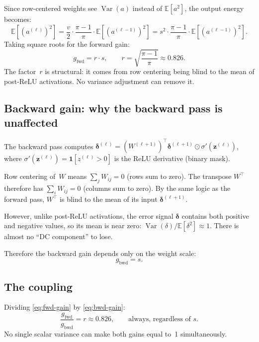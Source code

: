 \documentclass[11pt,a4paper]{article}
\theoremstyle{definition}
\newcommand{\E}{\mathbb{E}}
\newcommand{\Var}{\operatorname{Var}}
\begin{document}
Since row-centered weights see $\Var(a)$ instead of $\E[a^2]$, the output energy becomes:
\[
  \E[(a^{(\ell)})^2] = \frac{v}{2} \cdot \frac{\pi-1}{\pi} \cdot \E[(a^{(\ell-1)})^2]
                      = s^2 \cdot \frac{\pi-1}{\pi} \cdot \E[(a^{(\ell-1)})^2].
\]
Taking square roots for the forward gain:
\begin{equation}\label{eq:fwd-gain}
  \boxed{\;g_{\mathrm{fwd}} = r \cdot s,
  \qquad r = \sqrt{\frac{\pi-1}{\pi}} \approx 0.826.\;}
\end{equation}
The factor~$r$ is structural: it comes from row centering being blind to the
mean of post-ReLU activations.  No variance adjustment can remove it.

\subsection{Backward gain: why the backward pass is unaffected}
\label{sec:bwd-derivation}

The backward pass computes
$\bm{\delta}^{(\ell)} = (W^{(\ell+1)})^\top \bm{\delta}^{(\ell+1)} \odot \sigma'(\bm{z}^{(\ell)})$,
where $\sigma'(\bm{z}^{(\ell)}) = \mathbf{1}[z^{(\ell)} > 0]$ is the ReLU derivative
(binary mask).

Row centering of~$W$ means $\sum_j W_{ij} = 0$ (rows sum to zero).  The
transpose $W^\top$ therefore has $\sum_i W_{ij} = 0$ (columns sum to zero).
By the same logic as the forward pass, $W^\top$ is blind to the mean of
its input $\bm{\delta}^{(\ell+1)}$.

However, unlike post-ReLU activations, the error signal
$\bm{\delta}$ contains both positive and negative values, so its mean
is near zero: $\Var(\delta)/\E[\delta^2] \approx 1$.  There is
almost no ``DC component'' to lose.

Therefore the backward gain depends only on the weight scale:
\begin{equation}\label{eq:bwd-gain}
  \boxed{\;g_{\mathrm{bwd}} = s.\;}
\end{equation}

\subsection{The coupling}
Dividing \eqref{eq:fwd-gain} by \eqref{eq:bwd-gain}:
\begin{equation}\label{eq:coupling}
  \frac{g_{\mathrm{fwd}}}{g_{\mathrm{bwd}}} = r \approx 0.826,
  \qquad\text{always, regardless of } s.
\end{equation}
No single scalar variance can make both gains equal to~1 simultaneously.
\end{document}
